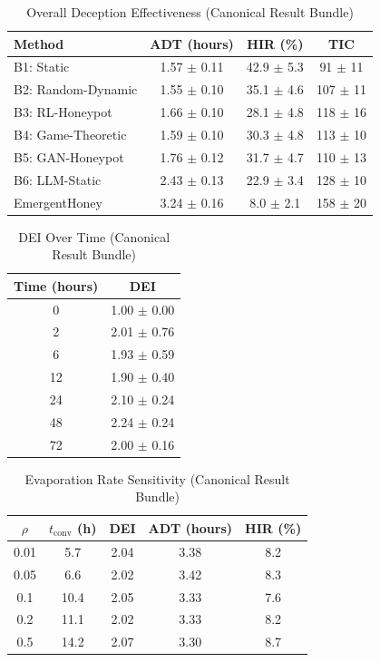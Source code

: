 \begin{table}[t]
\centering
\caption{Overall Deception Effectiveness (Canonical Result Bundle)}
\small
\begin{tabular}{@{}lccc@{}}
\toprule
Method & ADT (hours) & HIR (\%) & TIC \\
\midrule
B1: Static & 1.57 $\pm$ 0.11 & 42.9 $\pm$ 5.3 & 91 $\pm$ 11 \\
B2: Random-Dynamic & 1.55 $\pm$ 0.10 & 35.1 $\pm$ 4.6 & 107 $\pm$ 11 \\
B3: RL-Honeypot & 1.66 $\pm$ 0.10 & 28.1 $\pm$ 4.8 & 118 $\pm$ 16 \\
B4: Game-Theoretic & 1.59 $\pm$ 0.10 & 30.3 $\pm$ 4.8 & 113 $\pm$ 10 \\
B5: GAN-Honeypot & 1.76 $\pm$ 0.12 & 31.7 $\pm$ 4.7 & 110 $\pm$ 13 \\
B6: LLM-Static & 2.43 $\pm$ 0.13 & 22.9 $\pm$ 3.4 & 128 $\pm$ 10 \\
EmergentHoney & 3.24 $\pm$ 0.16 & 8.0 $\pm$ 2.1 & 158 $\pm$ 20 \\
\bottomrule
\end{tabular}
\end{table}

\begin{table}[t]
\centering
\caption{DEI Over Time (Canonical Result Bundle)}
\small
\begin{tabular}{@{}cc@{}}
\toprule
Time (hours) & DEI \\
\midrule
0 & 1.00 $\pm$ 0.00 \\
2 & 2.01 $\pm$ 0.76 \\
6 & 1.93 $\pm$ 0.59 \\
12 & 1.90 $\pm$ 0.40 \\
24 & 2.10 $\pm$ 0.24 \\
48 & 2.24 $\pm$ 0.24 \\
72 & 2.00 $\pm$ 0.16 \\
\bottomrule
\end{tabular}
\end{table}

\begin{table}[t]
\centering
\caption{Evaporation Rate Sensitivity (Canonical Result Bundle)}
\small
\begin{tabular}{@{}ccccc@{}}
\toprule
$\rho$ & $t_{\mathrm{conv}}$ (h) & DEI & ADT (hours) & HIR (\%) \\
\midrule
0.01 & 5.7 & 2.04 & 3.38 & 8.2 \\
0.05 & 6.6 & 2.02 & 3.42 & 8.3 \\
0.1 & 10.4 & 2.05 & 3.33 & 7.6 \\
0.2 & 11.1 & 2.02 & 3.33 & 8.2 \\
0.5 & 14.2 & 2.07 & 3.30 & 8.7 \\
\bottomrule
\end{tabular}
\end{table}

